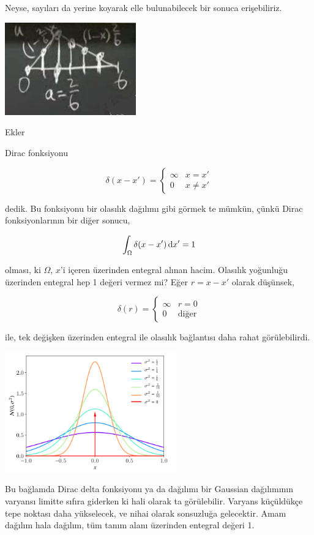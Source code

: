 \documentclass[12pt,fleqn]{article}\usepackage{../../common}
\begin{document}
Neyse, sayıları da yerine koyarak elle bulunabilecek bir sonuca
erişebiliriz.

\includegraphics[height=4cm]{4_15.png}

Ekler

Dirac fonksiyonu

$$
\delta(x-x') =
\left\{ \begin{array}{ll}
\infty & x = x' \\
0 & x \ne x'
\end{array} \right.
$$

dedik. Bu fonksiyonu bir olasılık dağılımı gibi görmek te mümkün, çünkü Dirac
fonksiyonlarının bir diğer sonucu,

$$
\int_\Omega \delta(x-x') \,\mathrm{d} x' = 1
$$

olması, ki $\Omega$, $x$'i içeren üzerinden entegral alınan hacim. Olasılık
yoğunluğu üzerinden entegral hep 1 değeri vermez mi? Eğer $r = x-x'$ olarak
düşünsek,

$$
\delta(r) =
\left\{ \begin{array}{ll}
\infty & r = 0 \\
0 & \text{diğer}
\end{array} \right.
$$

ile, tek değişken üzerinden entegral ile olasılık bağlantısı daha rahat
görülebilirdi.

\includegraphics[width=20em]{4_16.png}

Bu bağlamda Dirac delta fonksiyonu ya da dağılımı bir Gaussian dağılımının
varyansı limitte sıfıra giderken ki hali olarak ta görülebilir. Varyans
küçüldükçe tepe noktası daha yükselecek, ve nihai olarak sonsuzluğa
gelecektir. Amam dağılım hala dağılım, tüm tanım alanı üzerinden entegral değeri
1.
\end{document}
